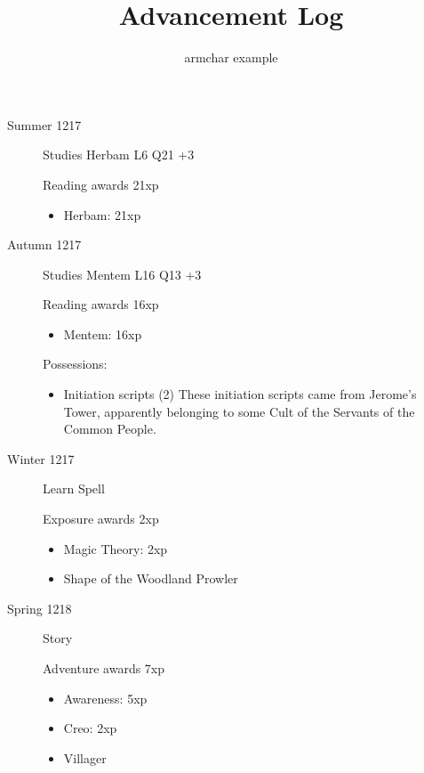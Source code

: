\documentclass{scrartcl}
\title{Advancement Log}
\author{armchar example}
\begin{document}
\maketitle
\begin{description}
  \item[Summer 1217]
    Studies Herbam L6 Q21 +3

    Reading awards 21xp
    \begin{itemize}
      \item Herbam: 21xp
    \end{itemize}
  \item[Autumn 1217]
    Studies Mentem L16 Q13 +3

    Reading awards 16xp
    \begin{itemize}
      \item Mentem: 16xp
    \end{itemize}
    Possessions:
    \begin{itemize}
      \item Initiation scripts (2)
             These initiation scripts came from Jerome's Tower, apparently belonging to some Cult of the Servants of the Common People.
    \end{itemize}
  \item[Winter 1217]
    Learn Spell

    Exposure awards 2xp
    \begin{itemize}
      \item Magic Theory: 2xp
      \item Shape of the Woodland Prowler
    \end{itemize}
  \item[Spring 1218]
    Story

    Adventure awards 7xp
    \begin{itemize}
      \item Awareness: 5xp
      \item Creo: 2xp
      \item Villager
    \end{itemize}
\end{description}
\end{document}
